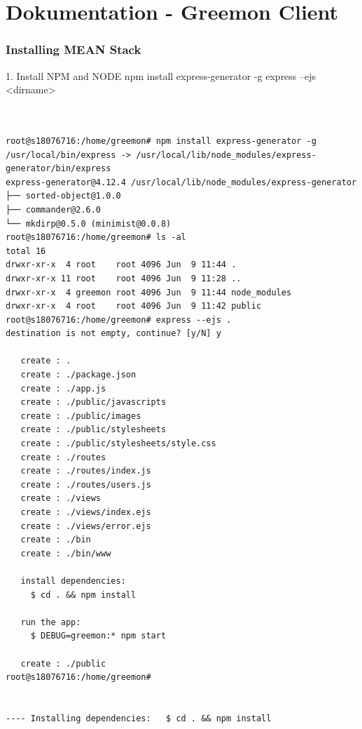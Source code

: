 \documentclass[pointlessnumbers]{scrartcl}
\begin{document}
\newpage
\part{Dokumentation - Greemon Client}
\section{Installing MEAN Stack}
    1. Install NPM and NODE
    npm install express-generator -g
    express --ejs <dirname>

\begin{lstlisting}


root@s18076716:/home/greemon# npm install express-generator -g
/usr/local/bin/express -> /usr/local/lib/node_modules/express-generator/bin/express
express-generator@4.12.4 /usr/local/lib/node_modules/express-generator
├── sorted-object@1.0.0
├── commander@2.6.0
└── mkdirp@0.5.0 (minimist@0.0.8)
root@s18076716:/home/greemon# ls -al 
total 16
drwxr-xr-x  4 root    root 4096 Jun  9 11:44 .
drwxr-xr-x 11 root    root 4096 Jun  9 11:28 ..
drwxr-xr-x  4 greemon root 4096 Jun  9 11:44 node_modules
drwxr-xr-x  4 root    root 4096 Jun  9 11:42 public
root@s18076716:/home/greemon# express --ejs .
destination is not empty, continue? [y/N] y

   create : .
   create : ./package.json
   create : ./app.js
   create : ./public/javascripts
   create : ./public/images
   create : ./public/stylesheets
   create : ./public/stylesheets/style.css
   create : ./routes
   create : ./routes/index.js
   create : ./routes/users.js
   create : ./views
   create : ./views/index.ejs
   create : ./views/error.ejs
   create : ./bin
   create : ./bin/www

   install dependencies:
     $ cd . && npm install

   run the app:
     $ DEBUG=greemon:* npm start

   create : ./public
root@s18076716:/home/greemon# 


---- Installing dependencies:   $ cd . && npm install



\end{lstlisting}






\end{document}
